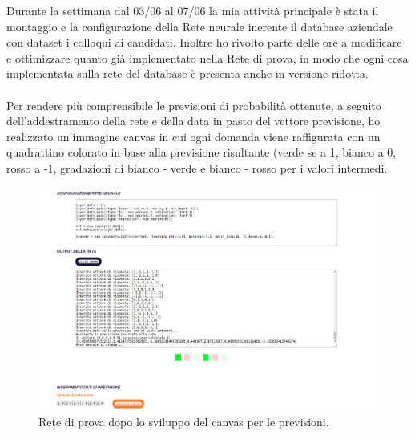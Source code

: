 Durante la settimana dal 03/06 al 07/06 la mia attivit\`a principale \`e stata il montaggio e la configurazione della Rete neurale inerente il database aziendale con dataset i colloqui ai candidati.
Inoltre ho rivolto parte delle ore a modificare e ottimizzare quanto gi\`a implementato nella Rete di prova, in modo che ogni cosa implementata sulla rete del database \`e presenta anche in versione ridotta.\\\\
Per rendere pi\`u comprensibile le previsioni di probabilit\`a ottenute, a seguito dell'addestramento della rete e della data in pasto del vettore previsione, ho realizzato un'immagine canvas in cui ogni domanda viene raffigurata con un quadrattino colorato in base alla previsione risultante (verde se a 1, bianco a 0, rosso a -1, gradazioni di bianco - verde e bianco - rosso per i valori intermedi.
\begin{figure}[H]
\centering
	\includegraphics[width=0.90\linewidth]{./image/rete_prova-canvas.png}
	\caption{Rete di prova dopo lo sviluppo del canvas per le previsioni.}
\end{figure}


